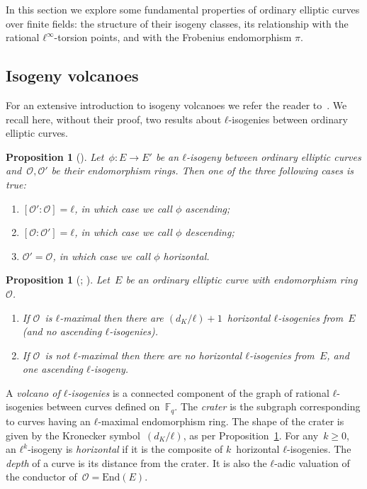 \documentclass{lms}
\newtheorem{prop}[thm]{Proposition}
\begin{document}
In this section we explore some fundamental properties of ordinary
elliptic curves over finite fields: the structure of their isogeny
classes, its relationship with the rational $ℓ^∞$-torsion points, and
with the Frobenius endomorphism $π$.

\subsection{Isogeny volcanoes}

For an extensive introduction to isogeny volcanoes we refer the
reader to~\cite{sutherland2013isogeny}.  We recall here, without their
proof, two results about $ℓ$-isogenies between ordinary elliptic
curves.

\begin{prop}[{\cite[Proposition~21]{kohel}}] \label{prop:isogeny-asc-desc}
Let~$ϕ: E → E'$ be an $ℓ$-isogeny between ordinary elliptic curves
and~$\mathcal O, \mathcal O'$ be their endomorphism rings.
Then one of the three following cases is true:
\begin{enumerate}
\item $[\mathcal O':\mathcal O] = ℓ$,
in which case we call $ϕ$ \emph{ascending};
\item $[\mathcal O:\mathcal O'] = ℓ$,
in which case we call $ϕ$ \emph{descending};
\item $\mathcal O' = \mathcal O$,
in which case we call $ϕ$ \emph{horizontal}.
\end{enumerate}
\end{prop}
\begin{prop}[{\cite[Proposition~23]{kohel}; \cite[Lemma~6]{sutherland2013isogeny}}] \label{prop:isogeny-count}
Let~$E$ be an ordinary elliptic curve with endomorphism ring~$\mathcal O$.
\begin{enumerate}
\item If $\mathcal O$~is $ℓ$-maximal then
there are $(d_K/ℓ)+1$~horizontal $ℓ$-isogenies from~$E$
(and no ascending $ℓ$-isogenies).
\item If $\mathcal O$~is not $ℓ$-maximal then
there are no horizontal $ℓ$-isogenies from~$E$,
and one ascending $ℓ$-isogeny.
\end{enumerate}
\end{prop}

A \emph{volcano of $ℓ$-isogenies} is a connected component
of the graph of rational $ℓ$-isogenies between curves defined on~$\mathbb F_q$.
The \emph{crater} is the subgraph corresponding to curves
having an $ℓ$-maximal endomorphism ring.
The shape of the crater is given by the Kronecker symbol~$(d_K/ℓ)$,
as per Proposition~\ref{prop:isogeny-count}.
For any~$k ≥ 0$, an $ℓ^k$-isogeny is \emph{horizontal}
if it is the composite of $k$~horizontal $ℓ$-isogenies.
The \emph{depth} of a curve is its distance from the crater.
It is also the $ℓ$-adic valuation of the conductor
of~$\mathcal O = \mathrm{End}(E)$.
\end{document}
